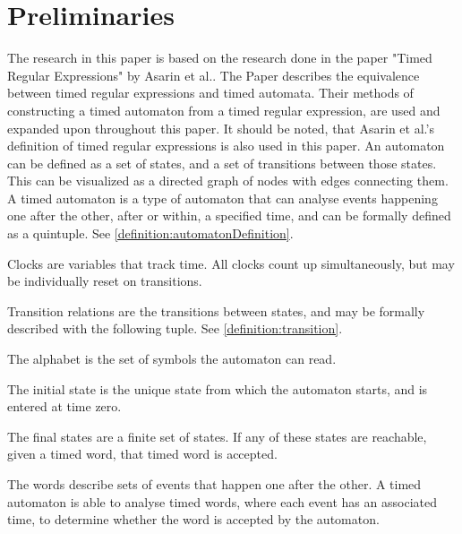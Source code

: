 \section{Preliminaries}\label{sec:preliminaries}






The research in this paper is based on the research done in the paper "Timed Regular Expressions" by Asarin et al.\cite{Eugene2001}. The Paper describes the equivalence between timed regular expressions and timed automata. Their methods of constructing a timed automaton from a timed regular expression, are used and expanded upon throughout this paper. It should be noted, that Asarin et al.'s definition of timed regular expressions is also used in this paper.
An automaton can be defined as a set of states, and a set of transitions between those states. This can be visualized as a directed graph of nodes with edges connecting them.
A timed automaton is a type of automaton that can analyse events happening one after the other, after or within, a specified time, and can be formally defined as a quintuple\cite{ALUR1994}. See \cref{definition:automatonDefinition}.


Clocks are variables that track time. All clocks count up simultaneously, but may be individually reset on transitions.

Transition relations are the transitions between states, and may be formally described with the following tuple. See \cref{definition:transition}.


The alphabet is the set of symbols the automaton can read.

The initial state is the unique state from which the automaton starts, and is entered at time zero.

The final states are a finite set of states. If any of these states are reachable, given a timed word, that timed word is accepted.

The words describe sets of events that happen one after the other. A timed automaton is able to analyse timed words, where each event has an associated time, to determine whether the word is accepted by the automaton.
